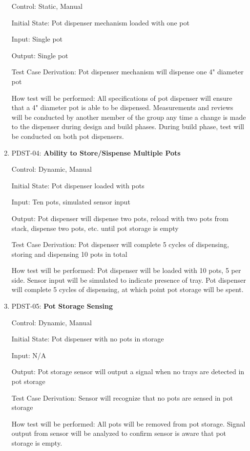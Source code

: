 \documentclass[12pt, titlepage]{article}
\begin{document}
\begin{enumerate}
  Control: Static, Manual

  Initial State: Pot dispenser mechanism loaded with one pot

  Input: Single pot

  Output: Single pot

  Test Case Derivation: Pot dispenser mechanism will dispense one 4" diameter pot

  How test will be performed: All specifications of pot dispenser will ensure that a 4" diameter pot is able 
  to be dispensed. Measurements and reviews will be conducted by another member of the group any time a change 
  is made to the dispenser during design and build phases. During build phase, test will be conducted on both 
  pot dispensers.\\

  \item{PDST-04: \textbf{Ability to Store/Sispense Multiple Pots}\\}
  
  Control: Dynamic, Manual

  Initial State: Pot dispenser loaded with pots

  Input: Ten pots, simulated sensor input

  Output: Pot dispenser will dispense two pots, reload with two pots from stack, dispense two pots, etc. until
  pot storage is empty

  Test Case Derivation: Pot dispenser will complete 5 cycles of dispensing, storing and dispensing 10 pots in total

  How test will be performed: Pot dispenser will be loaded with 10 pots, 5 per side. Sensor input will be simulated
  to indicate presence of tray. Pot dispenser will complete 5 cycles of dispensing, at which point pot storage will
  be spent.\\
  
  \item{PDST-05: \textbf{Pot Storage Sensing}\\}
  
  Control: Dynamic, Manual

  Initial State: Pot dispenser with no pots in storage

  Input: N/A

  Output: Pot storage sensor will output a signal when no trays are detected in pot storage

  Test Case Derivation: Sensor will recognize that no pots are sensed in pot storage

  How test will be performed: All pots will be removed from pot storage. Signal output from sensor will be
  analyzed to confirm sensor is aware that pot storage is empty.\\

\end{enumerate}
\end{document}

